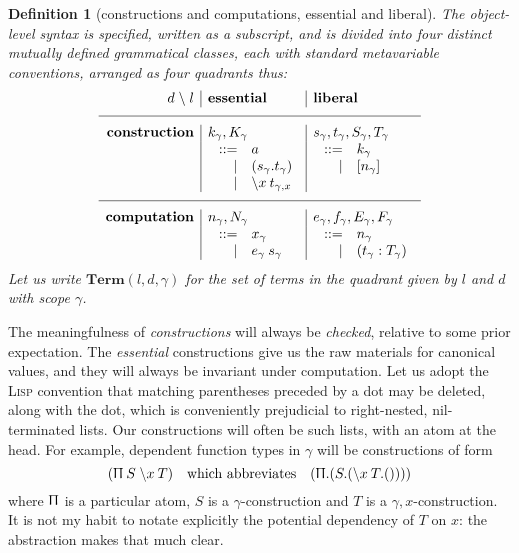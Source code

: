 \documentclass{jfp1}
\newtheorem{definition}[theorem]{Definition}
\begin{document}
\newcommand{\Tm}[3]{\mathbf{Term}(#1,#2,#3)}
\begin{definition}[constructions and computations, essential and liberal]
The object-level syntax is specified,
written as a subscript, and
is divided into four distinct mutually defined grammatical classes,
each with standard metavariable conventions,
arranged as four quadrants thus:
\[\begin{array}{r|l|l}
 d \;\backslash\; l& \mbox{\bf essential} & \mbox{\bf liberal} \\
\hline
    \mbox{\bf construction} & k_\gamma, K_\gamma & s_\gamma, t_\gamma, S_\gamma, T_\gamma \\
    & \;\begin{array}[t]{rl}
          ::= & a \\
          | & (s_\gamma.t_\gamma) \\
          | & \la xt_{\gamma,x}
        \end{array}
    & \;\begin{array}[t]{rl}
          ::= & k_\gamma \\
          | & [n_\gamma]
        \end{array}
    \\
    \hline
    \mbox{\bf computation} & n_\gamma, N_\gamma & e_\gamma, f_\gamma, E_\gamma, F_\gamma \\
    & \;\begin{array}[t]{rl}
          ::= & x_\gamma \\
          | & e_\gamma\:s_\gamma 
        \end{array}
    & \;\begin{array}[t]{rl}
          ::= & n_\gamma \\
          | & (t_\gamma:T_\gamma) 
        \end{array}
    \\
  \end{array}\]
Let us write $\Tm ld\gamma$ for the set of terms in the quadrant given by $l$
and $d$ with scope $\gamma$.
\end{definition}

\newcommand{\PI}[3]{(\Uppi\:#1\;\la{#2}{#3})}
The meaningfulness of \emph{constructions} will always be
\emph{checked}, relative to some prior expectation. The
\emph{essential} constructions give us the raw materials for
canonical values, and they will always be invariant under computation.
Let us adopt the \textsc{Lisp} convention that matching parentheses
preceded by a dot may be deleted, along with the dot, which is
conveniently prejudicial to right-nested, nil-terminated lists. Our
constructions will often be such lists, with an atom at the head.
For example, dependent function types in $\gamma$ will be constructions of form
\[\PI {S}x{T}\quad
  \mbox{which abbreviates}\quad
  (\Uppi.(S.(\la x T.())))
\]
where $\Uppi$ is a particular atom, $S$ is a $\gamma$-construction and
$T$ is a $\gamma,x$-construction. It is not my habit to notate
explicitly the potential dependency of $T$ on $x$: the abstraction
makes that much clear.
\end{document}

